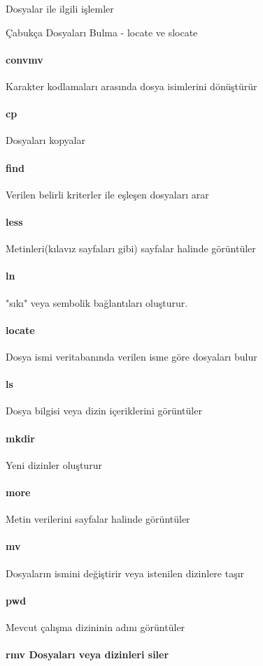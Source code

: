 \begin{section}{Dosyalar ile ilgili işlemler}
\begin{subsection}{Çabukça Dosyaları Bulma - locate ve slocate}
\paragraph{convmv}{	Karakter kodlamaları arasında dosya isimlerini dönüştürür}
\paragraph{cp}{	Dosyaları kopyalar}
\paragraph{find}{	Verilen belirli kriterler ile eşleşen dosyaları arar}
\paragraph{less}{	Metinleri(kılavız sayfaları gibi) sayfalar halinde görüntüler}
\paragraph{ln}{	"sıkı" veya sembolik bağlantıları oluşturur.}
\paragraph{locate}{	Dosya ismi veritabanında verilen isme göre dosyaları bulur}
\paragraph{ls}{	Dosya bilgisi veya dizin içeriklerini görüntüler}
\paragraph{mkdir}{	Yeni dizinler oluşturur}
\paragraph{more}{	Metin verilerini sayfalar halinde görüntüler}
\paragraph{mv}{	Dosyaların ismini değiştirir veya istenilen dizinlere taşır}
\paragraph{pwd}{	Mevcut çalışma dizininin adını görüntüler}
\paragraph{rmv	Dosyaları veya dizinleri siler}

\end{subsection}
\end{section}
